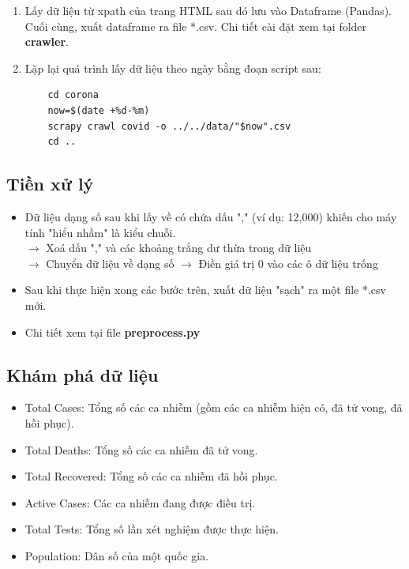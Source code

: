 \documentclass[a4paper, 12pt]{article}
\begin{document}
\begin{itemize}
\begin{itemize}
\begin{enumerate}
                \item Lấy dữ liệu từ xpath của trang HTML sau đó lưu vào Dataframe (Pandas). Cuối cùng, xuất dataframe ra file *.csv. Chi tiết cài đặt xem tại folder \textbf{crawler}.
                \item Lặp lại quá trình lấy dữ liệu theo ngày bằng đoạn script sau:
                \begin{verbatim}
    cd corona
    now=$(date +%d-%m)
    scrapy crawl covid -o ../../data/"$now".csv
    cd ..
                \end{verbatim}
            \end{enumerate}
        \end{itemize}
    \end{itemize}

    \subsection{Tiền xử lý}

    \begin{itemize}
        \item Dữ liệu dạng số sau khi lấy về có chứa dấu "," (ví dụ: 12,000) khiến cho máy tính "hiểu nhầm" là kiểu chuỗi.\\
        $\rightarrow$ Xoá dấu "," và các khoảng trắng dư thừa trong dữ liệu\\
        $\rightarrow$ Chuyển dữ liệu về dạng số
        $\rightarrow$ Điền giá trị 0 vào các ô dữ liệu trống

        \item Sau khi thực hiện xong các bước trên, xuất dữ liệu "sạch" ra một file *.csv mới.
        \item Chi tiết xem tại file \textbf{preprocess.py}
    \end{itemize}

    \subsection{Khám phá dữ liệu}

    \begin{itemize}
        \item Total Cases: Tổng số các ca nhiễm (gồm các ca nhiễm hiện có, đã tử vong, đã hồi phục).
        \item Total Deaths: Tổng số các ca nhiễm đã tử vong.
        \item Total Recovered: Tổng số các ca nhiễm đã hồi phục.
        \item Active Cases: Các ca nhiễm đang được điều trị.
        \item Total Tests: Tổng số lần xét nghiệm được thực hiện.
        \item Population: Dân số của một quốc gia.
    \end{itemize}
\end{document}
